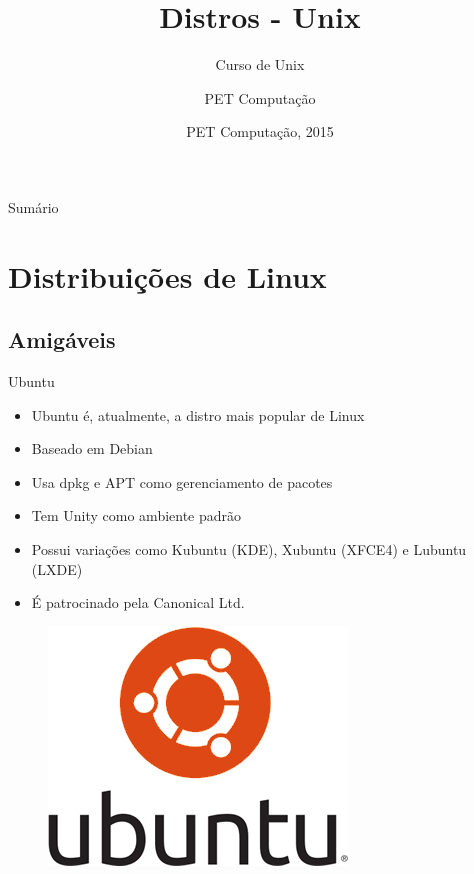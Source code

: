 \documentclass{beamer}
\title{Distros - Unix}
\subtitle{Curso de Unix}
\author{PET Computação}
\institute[UFSC] %
{
%
  Departamento de Informática e Estatística\\
  Universidade de Santa Catarina}
\date{PET Computação, 2015}
\begin{document}
\begin{frame}
  \titlepage
\end{frame}

\begin{frame}{Sumário}
  \tableofcontents
\end{frame}

\section{Distribuições de Linux}

\subsection{Amigáveis}

\begin{frame}{Ubuntu}
    \begin{itemize}
        \item{Ubuntu é, atualmente, a distro mais popular de Linux}
        \item{Baseado em Debian}
        \item{Usa dpkg e APT como gerenciamento de pacotes}
        \item{Tem Unity como ambiente padrão}
        \item{Possui variações como Kubuntu (KDE), Xubuntu (XFCE4) e Lubuntu (LXDE)}
        \item{É patrocinado pela Canonical Ltd.}
    \end{itemize}
    \begin{figure}[h!]
        \centering
        \includegraphics[scale=0.25]{ubuntu.png}
    \end{figure}
\end{frame}
\end{document}
